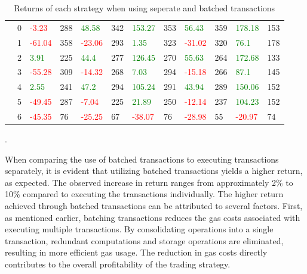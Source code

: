 \begin{table}[H]
\begin{adjustwidth}{-0.8in}{-0.9in}
\begin{tabular}{|p{2em}|p{2em}|p{3em}|p{3em}|p{3em}|p{3em}|p{3em}|p{3em}|p{3em}|p{3em}|p{3em}|p{3em}|}
            \parbox[t]{4em}{} & 0 & \textcolor{red}{-3.23} & 288 & \textcolor{green}{48.58} & 342 & \textcolor{green}{153.27} & 353 & \textcolor{green}{56.43} & 359 & \textcolor{green}{178.18} & 153\\
            & 1 & \textcolor{red}{-61.04} & 358 & \textcolor{red}{-23.06} & 293 & \textcolor{green}{1.35} & 323 & \textcolor{red}{-31.02} & 320 & \textcolor{green}{76.1} & 178\\
            & 2 & \textcolor{green}{3.91} & 225 & \textcolor{green}{44.4} & 277 & \textcolor{green}{126.45} & 270 & \textcolor{green}{55.63} & 264 & \textcolor{green}{172.68} & 133\\
            & 3 & \textcolor{red}{-55.28} & 309 & \textcolor{red}{-14.32} & 268 & \textcolor{green}{7.03} & 294 & \textcolor{red}{-15.18} & 266 & \textcolor{green}{87.1} & 145\\
            & 4 & \textcolor{green}{2.55} & 241 & \textcolor{green}{47.2} & 294 & \textcolor{green}{105.24} & 291 & \textcolor{green}{43.94} & 289 & \textcolor{green}{150.06} & 152\\
            & 5 & \textcolor{red}{-49.45} & 287 & \textcolor{red}{-7.04} & 225 & \textcolor{green}{21.89} & 250 & \textcolor{red}{-12.14} & 237 & \textcolor{green}{104.23} & 152\\
            & 6 & \textcolor{red}{-45.35} & 76 & \textcolor{red}{-25.25} & 67 & \textcolor{red}{-38.07} & 76 & \textcolor{red}{-28.98} & 55 & \textcolor{red}{-20.97} & 74\\\hline
        \end{tabular}
    \end{adjustwidth}
    \caption{Returns of each strategy when using seperate and batched transactions \label{tab:BatchedVsSeperate}}.
\end{table}
\noindent When comparing the use of batched transactions to executing transactions separately, it is evident that utilizing batched transactions yields a higher return, as expected. The observed increase in return ranges from approximately 2\% to 10\% compared to executing the transactions individually. The higher return achieved through batched transactions can be attributed to several factors. First, as mentioned earlier, batching transactions reduces the gas costs associated with executing multiple transactions. By consolidating operations into a single transaction, redundant computations and storage operations are eliminated, resulting in more efficient gas usage. The reduction in gas costs directly contributes to the overall profitability of the trading strategy.

